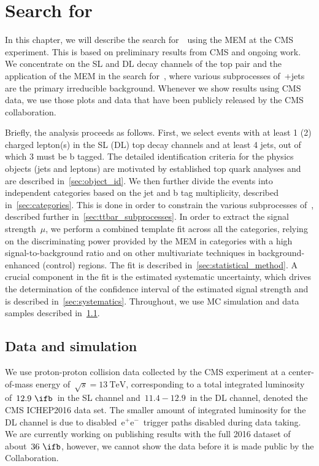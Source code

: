 \section{Search for \ttHbb}

In this chapter, we will describe the search for~\ttHbb~using the MEM at the CMS experiment. This is based on preliminary results from CMS\cite{CMS-PAS-HIG-16-038} and ongoing work. We concentrate on the SL and DL decay channels of the top pair and the application of the MEM in the search for~\ttHbb, where various subprocesses of~\ttbar+jets are the primary irreducible background. Whenever we show results using CMS data, we use those plots and data that have been publicly released by the CMS collaboration.

Briefly, the analysis proceeds as follows. First, we select events with at least 1 (2) charged lepton(s) in the SL (DL) top decay channels and at least 4 jets, out of which 3 must be b tagged. The detailed identification criteria for the physics objects (jets and leptons) are motivated by established top quark analyses and are described in~\cref{sec:object_id}. We then further divide the events into independent categories based on the jet and b tag multiplicity, described in~\cref{sec:categories}. This is done in order to constrain the various subprocesses of~\ttbar, described further in~\cref{sec:ttbar_subprocesses}. In order to extract the signal strength~$\mu$, we perform a combined template fit across all the categories, relying on the discriminating power provided by the MEM in categories with a high signal-to-background ratio and on other multivariate techniques in background-enhanced (control) regions. The fit is described in~\cref{sec:statistical_method}.
A crucial component in the fit is the estimated systematic uncertainty, which drives the determination of the confidence interval of the estimated signal strength and is described in~\cref{sec:systematics}. Throughout, we use MC simulation and data samples described in~\cref{sec:data_mc}.

\subsection{Data and simulation}
\label{sec:data_mc}

We use proton-proton collision data collected by the CMS experiment at a center-of-mass energy of~$\sqrt{s} = 13~\mathrm{TeV}$, corresponding to a total integrated luminosity of~$12.9~\ifb$~in the SL channel and~$11.4-12.9$~in the DL channel, denoted the CMS ICHEP2016 data set. The smaller amount of integrated luminosity for the DL channel is due to disabled~$\mathrm{e}^+\mathrm{e}^-$~trigger paths disabled during data taking. We are currently working on publishing results with the full 2016 dataset of about~$36~\ifb$, however, we cannot show the data before it is made public by the Collaboration.

